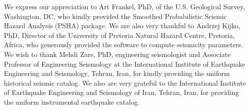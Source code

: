 \documentclass{article}
\begin{document}
 We express our appreciation to Art Frankel, PhD, of the U.S. Geological Survey, Washington, DC, who kindly provided the Smoothed Probabilistic Seismic Hazard Analysis (PSHA) package. We are also very thankful to Andrzej Kijko, PhD, Director of the University of Pretoria Natural Hazard Centre, Pretoria, Africa, who generously provided the software to compute seismicity parameters. We wish to thank Mehdi Zare, PhD, engineering seismologist and Associate Professor of Engineering Seismology at the International Institute of Earthquake Engineering and Seismology, Tehran, Iran, for  kindly providing the uniform historical seismic catalog. We also are very grateful to the International Institute of Earthquake Engineering and Seismology of Iran, Tehran, Iran, for providing the uniform instrumental earthquake catalog. 





\newpage


{
\renewcommand{\bibname}{}


}
\end{document}
